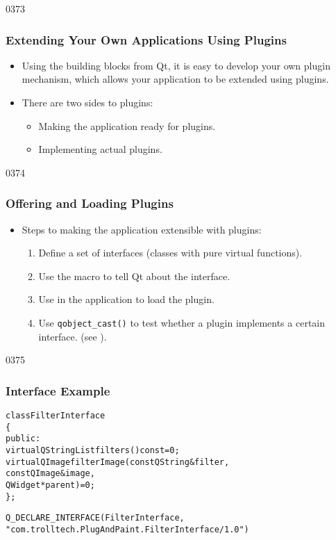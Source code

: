 \begin{slide}[fragile]{0373}
\frametitle{Extending Your Own Applications Using Plugins}
\begin{itemize}
\item Using the building blocks from Qt, it is easy to develop
  your own plugin mechanism, which allows your application to be extended
  using plugins. 
\item There are two sides to plugins:
  \begin{itemize}
  \item Making the application ready for plugins.
  \item Implementing actual plugins.
  \end{itemize}
\end{itemize}
\end{slide}

\begin{slide}{0374}
\frametitle{Offering and Loading Plugins}
\begin{itemize}
\item Steps to making the application extensible with plugins:
  \begin{enumerate}
  \item Define a set of interfaces (classes with pure virtual functions).
  \item Use the  macro to tell Qt about the
    interface.
  \item Use  in the application to load the plugin.
  \item Use \texttt{qobject\_cast()} to test whether a plugin implements a
    certain interface. (see ).
  \end{enumerate}
\end{itemize}
\end{slide}

\begin{slide}[fragile]{0375}
\frametitle{Interface Example}
\begin{alltt}\small
class FilterInterface
\{
public:
    virtual QStringList filters() const = 0;
    virtual QImage filterImage(const QString &filter, 
                               const QImage &image,
                               QWidget *parent) = 0;
\};

Q_DECLARE_INTERFACE(FilterInterface,
    "com.trolltech.PlugAndPaint.FilterInterface/1.0")
  \end{alltt}
\end{slide}

